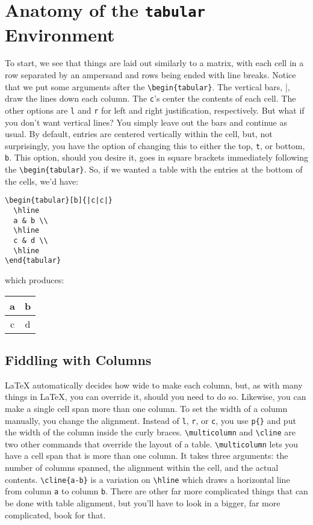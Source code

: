 \section{Anatomy of the \texttt{tabular} Environment}
\label{sec:anat-tabular-envir}

To start, we see that things are laid out similarly to a matrix, with
each cell in a row separated by an ampersand and rows being ended with
line breaks.  Notice that we put some arguments after the
\verb|\begin{tabular}|.  The vertical bars, |, draw the lines down
each column.  The \texttt{c}'s center the contents of each cell.
The other options are \texttt{l} and \texttt{r} for left and right
justification, respectively.  But what if you don't want vertical
lines?  You simply leave out the bars and continue as usual.  By
default, entries are centered vertically within the cell, but, not
surprisingly, you have the option of changing this to either the top,
\texttt{t}, or bottom, \texttt{b}.  This option, should you desire it,
goes in square brackets immediately following the
\verb|\begin{tabular}|.  So, if we wanted a table with the entries at
the bottom of the cells, we'd have:
\begin{verbatim}
\begin{tabular}[b]{|c|c|}
  \hline
  a & b \\
  \hline
  c & d \\
  \hline
\end{tabular}
\end{verbatim}
which produces:
\begin{center}
\begin{tabular}[b]{|c|c|}
  \hline
  a & b \\
  \hline
  c & d \\
  \hline
\end{tabular}
\end{center}

\subsection{Fiddling with Columns}
\label{sec:fiddl-with-columns}

\LaTeX{} automatically decides how wide to make each column, but, as
with many things in \LaTeX{}, you can override it, should you need to
do so.  Likewise, you can make a single cell span more than one
column. To set the width of a column manually, you change the
alignment.  Instead of \texttt{l}, \texttt{r}, or \texttt{c}, you use
\verb|p{}| and put the width of the column inside the curly braces.
\verb|\multicolumn| and \verb|\cline| are two other commands that
override the layout of a table.  \verb|\multicolumn| lets you have a
cell span that is more than one column.  It takes three arguments: the
number of columns spanned, the alignment within the cell, and the
actual contents.  \verb|\cline{a-b}| is a variation on \verb|\hline|
which draws a horizontal line from column \texttt{a} to column
\texttt{b}.  There are other far more complicated things that can be
done with table alignment, but you'll have to look in a bigger, far
more complicated, book for that.

